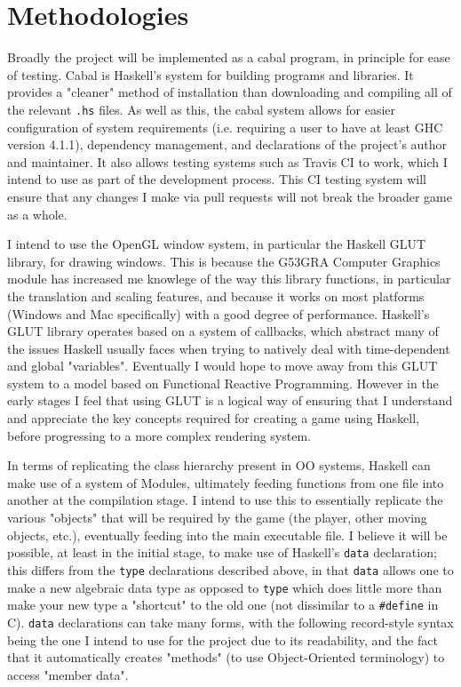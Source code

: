 \documentclass[12pt, a4paper]{report}
\begin{document}
\section{Methodologies}
Broadly the project will be implemented as a cabal program, in principle for ease of testing.
Cabal is Haskell's system for building programs and libraries\cite{cabal}.
It provides a "cleaner" method of installation than downloading and compiling all of the relevant \verb|.hs| files.
As well as this, the cabal system allows for easier configuration of system requirements (i.e. requiring a user to have at least GHC version 4.1.1), dependency management, and declarations of the project's author and maintainer.
It also allows testing systems such as Travis CI to work\cite{travisci}, which I intend to use as part of the development process.
This CI testing system will ensure that any changes I make via pull requests will not break the broader game as a whole.

\par

I intend to use the OpenGL window system, in particular the Haskell GLUT library, for drawing windows.
This is because the G53GRA Computer Graphics module has increased me knowlege of the way this library functions, in particular the translation and scaling features, and because it works on most platforms (Windows and Mac specifically) with a good degree of performance.
Haskell's GLUT library operates based on a system of callbacks\cite{glutpage}, which abstract many of the issues Haskell usually faces when trying to natively deal with time-dependent and global "variables".
Eventually I would hope to move away from this GLUT system to a model based on Functional Reactive Programming.
However in the early stages I feel that using GLUT is a logical way of ensuring that I understand and appreciate the key concepts required for creating a game using Haskell, before progressing to a more complex rendering system.

\par

In terms of replicating the class hierarchy present in OO systems, Haskell can make use of a system of Modules, ultimately feeding functions from one file into another at the compilation stage.
I intend to use this to essentially replicate the various "objects" that will be required by the game (the player, other moving objects, etc.), eventually feeding into the main executable file.
I believe it will be possible, at least in the initial stage, to make use of Haskell's \verb|data| declaration; this differs from the \verb|type| declarations described above, in that \verb|data| allows one to make a new algebraic data type as opposed to \verb|type| which does little more than make your new type a "shortcut" to the old one (not dissimilar to a \verb|#define| in C).
\verb|data| declarations can take many forms, with the following record-style syntax being the one I intend to use for the project due to its readability, and the fact that it automatically creates "methods" (to use Object-Oriented terminology) to access "member data".
\end{document}

